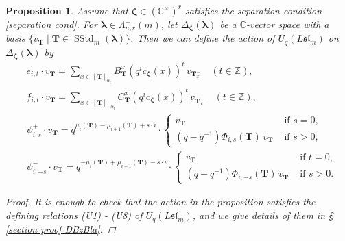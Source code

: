 \documentclass[12pt]{amsart}
\newtheorem{prop}[thm]{Proposition}
\numberwithin{equation}{thm}
\newcommand\CC{\mathbb C}
\newcommand\ZZ{\mathbb Z}
\newcommand\bT{\mathbf T}
\renewcommand\a{\alpha}  %
\newcommand\D{\Delta}
\newcommand\vL{\varLambda}
\newcommand\Bz{\boldsymbol\zeta}
\newcommand\Bla{\boldsymbol\lambda}
\newcommand\Fsl{\mathfrak{sl}}
\newcommand{\SStd}{\operatorname{SStd}}
\newcounter{ni}
\begin{document}
\begin{prop}
\label{Prop Def DBz Bla} 
Assume that $\Bz \in (\CC^{\times})^r$ satisfies the separation condition \eqref{separation cond}. 
For $\Bla \in \vL_{n,r}^+(m)$, let $\D_{\Bz} (\Bla)$ be a $\CC$-vector space 
with a basis $\{ v_{\bT} \mid \bT \in \SStd_m(\Bla)\}$. 
Then we can define the action of $U_q (L\Fsl_m)$ on $\D_{\Bz} (\Bla)$ by 
\begin{align*}
& e_{i,t} \cdot v_{\bT} 
	= \sum_{ x \in [\bT]_{\a_i}} B_{\bT}^x (q^i c_{\Bz} ( x))^t  \, v_{\bT_x^-} 
	\quad ( t \in \ZZ), 
\\
& f_{i,t} \cdot v_{\bT} 
	= \sum_{x \in [\bT]_{-\a_i}} C_{\bT}^x (q^i c_{\Bz} (x))^t \, v_{\bT_x^+} 
	\quad (t \in \ZZ),  
\\
& \psi_{i,s}^+ \cdot v_{\bT} 
	= q^{\mu_i (\bT) - \mu_{i+1} (\bT) + s \cdot i} \cdot 
		\begin{cases}
		v_{\bT} & \text{ if } s =0, 
		\\
		(q-q^{-1}) \Phi_{i,s} (\bT) \,  v_{\bT} & \text{ if } s >0, 
		\end{cases}
\\
& \psi_{i, -s}^- \cdot v_{\bT} 
	= q^{- \mu_i (\bT) + \mu_{i+1} (\bT) - s \cdot i} \cdot 
		\begin{cases}
		v_{\bT} & \text{ if } t=0, 
		\\
		(q-q^{-1}) \Phi_{i, -s} (\bT) \, v_{\bT} & \text{ if } s >0. 
		\end{cases} 
\end{align*}
\begin{proof}
It is enough to check that the action in the proposition satisfies the defining relations (U1) - (U8) of $U_q (L\Fsl_m)$, 
and 
we give details of them in \S \, \ref{section proof DBzBla}. 
\end{proof}
\end{prop}
\end{document}
